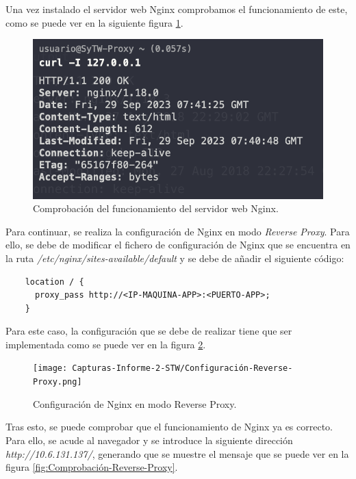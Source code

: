 \documentclass{report}
\begin{document}
  Una vez instalado el servidor web Nginx comprobamos el funcionamiento de este, como se puede ver en la siguiente figura \ref{fig:Comprobación-Nginx}. 

  \begin{figure}[H]
    \centering
    \includegraphics[scale=0.6]{Capturas-Informe-2-STW/Image-1.png}
    \caption{Comprobación del funcionamiento del servidor web Nginx.}
    \label{fig:Comprobación-Nginx}
  \end{figure}

  Para continuar, se realiza la configuración de Nginx en modo \emph{Reverse Proxy}. Para ello, se debe de modificar el fichero de configuración de Nginx que se encuentra en la ruta \emph{/etc/nginx/sites-available/default} y se debe de añadir el siguiente código:

  \begin{verbatim}
    location / {
      proxy_pass http://<IP-MAQUINA-APP>:<PUERTO-APP>;
    }
  \end{verbatim}

  Para este caso, la configuración que se debe de realizar tiene que ser implementada como se puede ver en la figura \ref{fig:Configuración-Reverse-Proxy}.

  \begin{figure}[H]
    \centering
    \texttt{[image: Capturas-Informe-2-STW/Configuración-Reverse-Proxy.png]}
    \caption{Configuración de Nginx en modo Reverse Proxy.}
    \label{fig:Configuración-Reverse-Proxy}
  \end{figure}

  Tras esto, se puede comprobar que el funcionamiento de Nginx ya es correcto. Para ello, se acude al navegador y se introduce la siguiente dirección \emph{http://10.6.131.137/}, generando que se muestre el mensaje que se puede ver en la figura \ref{fig:Comprobación-Reverse-Proxy}.
\end{document}
